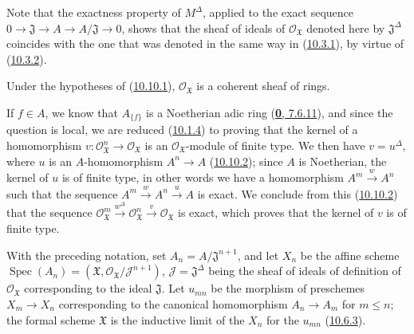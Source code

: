 Note that the exactness property of $M^\Delta$, applied to the exact
sequence
$0\to\mathfrak{J}\to A\to A/\mathfrak{J}\to0$, shows that the sheaf
of ideals of $\mathscr{O}_{\mathfrak{X}}$ denoted here by
$\mathfrak{J}^\Delta$ coincides with the one that was denoted in the same
way in (\hyperref[I.10.3.1]{10.3.1}), by virtue of
(\hyperref[I.10.3.2]{10.3.2}).

\begin{proposition}[10.10.3]
\label{I.10.10.3}
Under the hypotheses of \textup{(\hyperref[I.10.10.1]{10.10.1})},
$\mathscr{O}_{\mathfrak{X}}$ is a coherent sheaf of rings.
\end{proposition}

If $f\in A$, we know that $A_{\{f\}}$ is a Noetherian adic ring
(\hyperref[0.7.6.11]{\textbf{0}, 7.6.11}), and since the question is local,
we are reduced (\hyperref[I.10.1.4]{10.1.4}) to proving that the
kernel of a homomorphism
$v:\mathscr{O}_{\mathfrak{X}}^n\to\mathscr{O}_{\mathfrak{X}}$ is an
$\mathscr{O}_{\mathfrak{X}}$-module of finite type. We then have
$v=u^\Delta$, where $u$ is an $A$-homomorphism $A^n\to A$
(\hyperref[I.10.10.2]{10.10.2}); since $A$ is Noetherian, the kernel
of $u$ is of finite type, in other words we have a homomorphism
$A^m\xrightarrow{w}A^n$ such that the sequence
$A^m\xrightarrow{w}A^n\xrightarrow{u}A$ is exact. We conclude from this
(\hyperref[I.10.10.2]{10.10.2}) that the sequence
$\mathscr{O}_{\mathfrak{X}}^m\xrightarrow{w^\Delta}
\mathscr{O}_{\mathfrak{X}}^n\xrightarrow{v}
\mathscr{O}_{\mathfrak{X}}$ is exact, which proves that the kernel of
$v$ is of finite type.

\begin{env}[10.10.4]
\label{I.10.10.4}
With the preceding notation, set
$A_n=A/\mathfrak{J}^{n+1}$, and let $X_n$ be the affine scheme
$\operatorname{Spec}(A_n)=(\mathfrak{X},
\mathscr{O}_{\mathfrak{X}}/\mathscr{J}^{n+1})$,
$\mathscr{J}=\mathfrak{J}^\Delta$ being the sheaf of ideals of
definition of $\mathscr{O}_{\mathfrak{X}}$ corresponding to the ideal
$\mathfrak{J}$. Let $u_{mn}$ be the morphism of preschemes
$X_m\to X_n$ corresponding to the canonical homomorphism
$A_n\to A_m$ for $m\leq n$; the formal scheme $\mathfrak{X}$ is the
inductive limit of the $X_n$ for the $u_{mn}$
(\hyperref[I.10.6.3]{10.6.3}).
\end{env}

